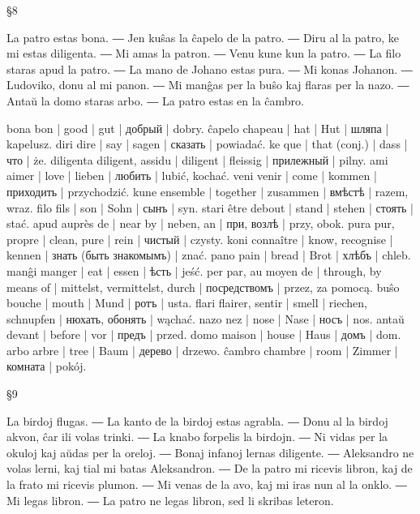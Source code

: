§8

La patro estas bona. ― Jen kuŝas la ĉapelo de la patro. ― Diru al la patro, ke mi estas diligenta. ― Mi amas la patron. ― Venu kune kun la patro. ― La filo staras apud la patro. ― La mano de Johano estas pura. ― Mi konas Johanon. ― Ludoviko, donu al mi panon. ― Mi manĝas per la buŝo kaj flaras per la nazo. ― Antaŭ la domo staras arbo. ― La patro estas en la ĉambro.

bona bon | good | gut | добрый | dobry.
ĉapelo chapeau | hat | Hut | шляпа | kapelusz.
diri dire | say | sagen | сказать | powiadać.
ke que | that (conj.) | dass | что | że.
diligenta diligent, assidu | diligent | fleissig | прилежный | pilny.
ami aimer | love | lieben | любить | lubić, kochać.
veni venir | come | kommen | приходить | przychodzić.
kune ensemble | together | zusammen | вмѣстѣ | razem, wraz.
filo fils | son | Sohn | сынъ | syn.
stari être debout | stand | stehen | стоять | stać.
apud auprès de | near by | neben, an | при, возлѣ | przy, obok.
pura pur, propre | clean, pure | rein | чистый | czysty.
koni connaître | know, recognise | kennen | знать (быть знакомымъ) | znać.
pano pain | bread | Brot | хлѣбъ | chleb.
manĝi manger | eat | essen | ѣсть | jeść.
per par, au moyen de | through, by means of | mittelst, vermittelst, durch | посредствомъ | przez, za pomocą.
buŝo bouche | mouth | Mund | ротъ | usta.
flari flairer, sentir | smell | riechen, schnupfen | нюхать, обонять | wąchać.
nazo nez | nose | Nase | носъ | nos.
antaŭ devant | before | vor | предъ | przed.
domo maison | house | Haus | домъ | dom.
arbo arbre | tree | Baum | дерево | drzewo.
ĉambro chambre | room | Zimmer | комната | pokój.

§9

La birdoj flugas. ― La kanto de la birdoj estas agrabla. ― Donu al la birdoj akvon, ĉar ili volas trinki. ― La knabo forpelis la birdojn. ― Ni vidas per la okuloj kaj aŭdas per la oreloj. ― Bonaj infanoj lernas diligente. ― Aleksandro ne volas lerni, kaj tial mi batas Aleksandron. ― De la patro mi ricevis libron, kaj de la frato mi ricevis plumon. ― Mi venas de la avo, kaj mi iras nun al la onklo. ― Mi legas libron. ― La patro ne legas libron, sed li skribas leteron.

